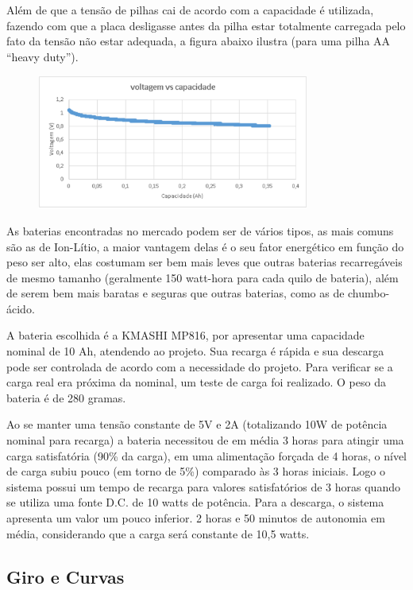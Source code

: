 Além de que a tensão de pilhas cai de acordo com a capacidade é utilizada, fazendo com que a placa desligasse antes da pilha estar totalmente carregada pelo fato da tensão não estar adequada, a figura abaixo ilustra (para uma pilha AA “heavy duty”).

\begin{figure}[H]
    \centering
    \includegraphics[width=0.8\textwidth]{figuras/volt_vs_cap.eps}
    \caption{}
    \label{fig:catia01}
\end{figure}

As baterias encontradas no mercado podem ser de vários tipos, as mais comuns são as de Ion-Lítio, a maior vantagem delas é o seu fator energético em função do peso ser alto, elas costumam ser bem mais leves que outras baterias recarregáveis de mesmo tamanho (geralmente 150 watt-hora para cada quilo de bateria), além de serem bem mais baratas e seguras que outras baterias, como as de chumbo-ácido.

A bateria escolhida é a KMASHI MP816, por apresentar uma capacidade nominal de 10 Ah, atendendo ao projeto. Sua recarga é rápida e sua descarga pode ser controlada de acordo com a necessidade do projeto.  Para verificar se a carga real era próxima da nominal, um teste de carga foi realizado. O peso da bateria é de 280 gramas.

Ao se manter uma tensão constante de 5V e 2A (totalizando 10W de potência nominal para recarga) a bateria necessitou de em média 3 horas para atingir uma carga satisfatória (90\% da carga), em uma alimentação forçada de 4 horas, o nível de carga subiu pouco (em torno de 5\%) comparado às 3 horas iniciais. Logo o sistema possui um tempo de recarga para valores satisfatórios de 3 horas quando se utiliza uma fonte D.C. de 10 watts de potência. Para a descarga, o sistema apresenta um valor um pouco inferior. 2 horas e 50 minutos de autonomia em média, considerando que a carga será constante de 10,5 watts.

\subsection{Giro e Curvas}

